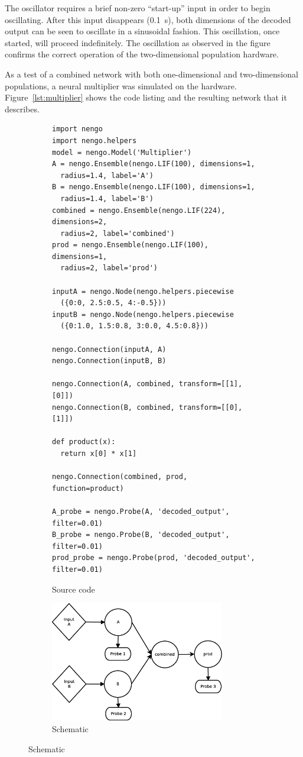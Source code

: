 \documentclass[english]{article}
\begin{document}
The oscillator requires a brief non-zero ``start-up'' input in order to begin oscillating.
After this input disappears (0.1~s), both dimensions of the decoded output can be seen to
oscillate in a sinusoidal fashion. This oscillation, once started, will proceed indefinitely.
The oscillation as observed in the figure confirms the correct operation of the two-dimensional
population hardware.

As a test of a combined network with both one-dimensional and two-dimensional populations,
a neural multiplier was simulated on the hardware. Figure~\ref{lst:multiplier} shows
the code listing and the resulting network that it describes.

\begin{figure}
\centering

\begin{subfigure}[b]{\textwidth}
\centering
\lstset{language=Python}
\begin{lstlisting}[frame=single]
import nengo
import nengo.helpers
model = nengo.Model('Multiplier')
A = nengo.Ensemble(nengo.LIF(100), dimensions=1,
  radius=1.4, label='A')
B = nengo.Ensemble(nengo.LIF(100), dimensions=1,
  radius=1.4, label='B')
combined = nengo.Ensemble(nengo.LIF(224), dimensions=2,
  radius=2, label='combined')
prod = nengo.Ensemble(nengo.LIF(100), dimensions=1,
  radius=2, label='prod')

inputA = nengo.Node(nengo.helpers.piecewise
  ({0:0, 2.5:0.5, 4:-0.5}))
inputB = nengo.Node(nengo.helpers.piecewise
  ({0:1.0, 1.5:0.8, 3:0.0, 4.5:0.8}))

nengo.Connection(inputA, A)
nengo.Connection(inputB, B)

nengo.Connection(A, combined, transform=[[1],[0]])
nengo.Connection(B, combined, transform=[[0],[1]])

def product(x):
  return x[0] * x[1]

nengo.Connection(combined, prod, function=product)

A_probe = nengo.Probe(A, 'decoded_output', filter=0.01)
B_probe = nengo.Probe(B, 'decoded_output', filter=0.01)
prod_probe = nengo.Probe(prod, 'decoded_output', filter=0.01)
\end{lstlisting}
\caption{Source code}
\label{lst:multiplier:code}
\end{subfigure}

\begin{subfigure}[b]{0.3\textwidth}
\centering
\includegraphics[width=3.0in]{multiplier-schematic.eps}
\caption{Schematic}
\label{lst:multiplier:schematic}
\end{subfigure}


\end{figure}
\end{document}
